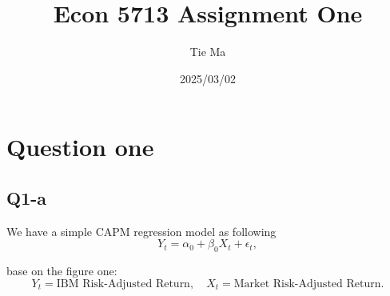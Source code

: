 \documentclass{article} %
\begin{document}
\title{Econ 5713 Assignment One}
\author{Tie Ma}
\date{2025/03/02}
\maketitle

\section*{Question one}
\subsection{Q1-a}




We have a simple CAPM regression model as following
\begin{equation}
Y_t = \alpha_0 + \beta_0 X_t + \epsilon_t,
\end{equation}

base on the figure one:
\[
Y_t = \text{IBM Risk-Adjusted Return}, 
\quad 
X_t = \text{Market Risk-Adjusted Return}.
\]
\end{document}

